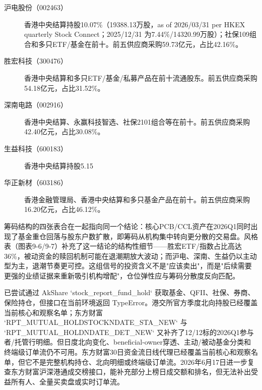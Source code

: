 \begin{exhibitbox}
\footnotesize
\begin{description}
  \item[沪电股份（002463）] 香港中央结算持股10.07\%（19388.13万股，as of 2026/03/31 per HKEX quarterly Stock Connect；2025/12/31 为7.44\%/14320.99万股）；社保109组合和多只ETF/基金在前十。前五供应商采购59.73亿元，占比42.16\%。
  \item[胜宏科技（300476）] 香港中央结算和多只ETF/基金/私募产品在前十流通股东。前五供应商采购54.18亿元，占比31.52\%。
  \item[深南电路（002916）] 香港中央结算、永赢科技智选、社保2101组合等在前十。前五供应商采购42.40亿元，占比30.08\%。
  \item[生益科技（600183）] 香港中央结算持股5.15%
  \item[华正新材（603186）] 香港金融管理局、香港中央结算和多只基金产品在前十。前五供应商采购16.20亿元，占比46.12\%。
\end{description}
\end{exhibitbox}

筹码结构的四张表合在一起指向同一个结论：核心PCB/CCL资产在2026Q1同时出现了基金重仓回落与股东户数扩散，即筹码从机构集中转向更分散的交易盘。风格表（图表9-6/9-7）补充了这一结论的结构性细节——胜宏ETF/指数占比高达36\%，被动资金的赎回机制可能在退潮期放大波动；而沪电、深南、生益仍以主动型为主，退潮节奏更可控。这组信号的投资含义不是"应该卖出"，而是"后续需要更强的业绩证据来重新吸引机构增配"，仓位弹性应与筹码分散度反向匹配。

\begin{sourcequalitybox}
已尝试通过 AkShare `stock\_report\_fund\_hold` 获取基金、QFII、社保、券商、保险持仓，但接口在当前环境返回 TypeError。港交所官方季度北向持股已经覆盖当前核心和观察名单；东方财富 `RPT\_MUTUAL\_HOLDSTOCKNDATE\_STA\_NEW` 与 `RPT\_MUTUAL\_HOLDNDATE\_DET\_NEW` 又补齐了12/12标的2026Q1参与者/托管行明细。但日度北向变化、beneficial-owner穿透、主动/被动基金分类和终端级订单流仍不可用。东方财富30日资金流日线代理已经覆盖当前核心和观察名单，但它不是完整机构持仓、北向明细或终端级订单流。2026年6月17日进一步复查东方财富沪深港通成交榜接口，能补充部分上榜日成交额和排名，但无法补出受益所有人、全量买卖盘或实时订单流。
\end{sourcequalitybox}


